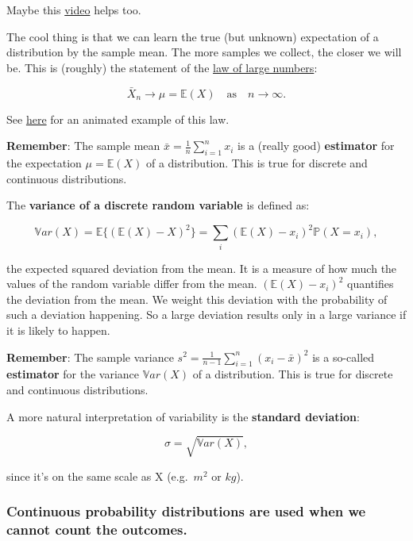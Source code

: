\documentclass[
]{book}
\begin{document}
Maybe this \href{https://www.youtube.com/watch?v=KLs_7b7SKi4}{video} helps too.

The cool thing is that we can learn the true (but unknown) expectation of a distribution by the sample mean. The more samples we collect, the closer we will be.
This is (roughly) the statement of the \href{https://en.wikipedia.org/wiki/Law_of_large_numbers}{law of large numbers}:

\[\bar{X}_n \rightarrow \mu = \mathbb{E}(X) \quad \text{as} \quad n \rightarrow \infty.\]

See \href{https://github.com/jdegenfellner/ZHAW_Teaching/blob/main/Law_of_Large_Numbers_Dice_animation.R}{here} for an animated example of this law.

\textbf{Remember}: The sample mean \(\bar{x} = \frac{1}{n} \sum_{i=1}^n x_i\) is a (really good) \textbf{estimator} for the expectation \(\mu = \mathbb{E}(X)\) of a distribution.
This is true for discrete and continuous distributions.

The \textbf{variance of a discrete random variable} is defined as:

\[\mathbb{V}ar(X) = \mathbb{E} \{ (\mathbb{E}(X) - X)^2 \} = \sum_i (\mathbb{E}(X) - x_i)^2 \mathbb{P}(X = x_i),\]

the expected squared deviation from the mean. It is a measure of how much the values of the random variable differ from the mean.
\((\mathbb{E}(X) - x_i)^2\) quantifies the deviation from the mean. We weight this deviation with the probability of such
a deviation happening. So a large deviation results only in a large variance if it is likely to happen.

\textbf{Remember}: The sample variance \(s^2 = \frac{1}{n-1} \sum_{i=1}^n (x_i - \bar{x})^2\) is a so-called \textbf{estimator}
for the variance \(\mathbb{V}ar(X)\) of a distribution.
This is true for discrete and continuous distributions.

A more natural interpretation of variability is the \textbf{standard deviation}:

\[\sigma = \sqrt{\mathbb{V}ar(X)},\]

since it's on the same scale as X (e.g.~\(m^2\) or \(kg\)).

\subsubsection{Continuous probability distributions are used when we cannot count the outcomes.}\label{continuous_probability_distributions}
\end{document}
